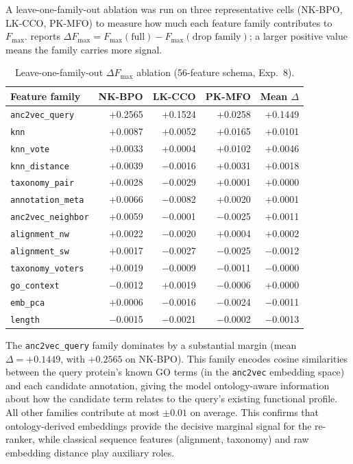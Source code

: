 A leave-one-family-out ablation was run on three representative cells
(NK-BPO, LK-CCO, PK-MFO) to measure how much each feature family contributes
to $F_{\max}$.  reports $\Delta F_{\max} =
F_{\max}(\text{full}) - F_{\max}(\text{drop family})$; a larger positive value
means the family carries more signal.

\begin{table}[htbp]
  \centering
  \caption[Re-ranker (56-feature) leave-one-family-out ablation]{Leave-one-family-out $\Delta F_{\max}$ ablation (56-feature schema, Exp.~8).}
  \label{tab:exp8-ablation}
  \begin{tabular}{lrrr r}
    \toprule
    \textbf{Feature family} & \textbf{NK-BPO} & \textbf{LK-CCO} & \textbf{PK-MFO} & \textbf{Mean $\Delta$} \\
    \midrule
    \texttt{anc2vec\_query}     & +0.2565 & +0.1524 & +0.0258 & +0.1449 \\
    \texttt{knn}                & +0.0087 & +0.0052 & +0.0165 & +0.0101 \\
    \texttt{knn\_vote}          & +0.0033 & +0.0004 & +0.0102 & +0.0046 \\
    \texttt{knn\_distance}      & +0.0039 & $-$0.0016 & +0.0031 & +0.0018 \\
    \texttt{taxonomy\_pair}     & +0.0028 & $-$0.0029 & +0.0001 & +0.0000 \\
    \texttt{annotation\_meta}   & +0.0066 & $-$0.0082 & +0.0020 & +0.0001 \\
    \texttt{anc2vec\_neighbor}  & +0.0059 & $-$0.0001 & $-$0.0025 & +0.0011 \\
    \texttt{alignment\_nw}      & +0.0022 & $-$0.0020 & +0.0004 & +0.0002 \\
    \texttt{alignment\_sw}      & +0.0017 & $-$0.0027 & $-$0.0025 & $-$0.0012 \\
    \texttt{taxonomy\_voters}   & +0.0019 & $-$0.0009 & $-$0.0011 & $-$0.0000 \\
    \texttt{go\_context}        & $-$0.0012 & +0.0019 & $-$0.0006 & +0.0000 \\
    \texttt{emb\_pca}           & +0.0006 & $-$0.0016 & $-$0.0024 & $-$0.0011 \\
    \texttt{length}             & $-$0.0015 & $-$0.0021 & $-$0.0002 & $-$0.0013 \\
    \bottomrule
  \end{tabular}
\end{table}

The \texttt{anc2vec\_query} family dominates by a substantial margin
(mean $\Delta = +0.1449$, with $+0.2565$ on NK-BPO). This family encodes
cosine similarities between the query protein's known GO terms (in the
\texttt{anc2vec} embedding space) and each candidate annotation, giving the
model ontology-aware information about how the candidate term relates to the
query's existing functional profile. All other families contribute at most
$\pm 0.01$ on average. This confirms that ontology-derived embeddings provide
the decisive marginal signal for the re-ranker, while classical sequence
features (alignment, taxonomy) and raw embedding distance play auxiliary roles.

